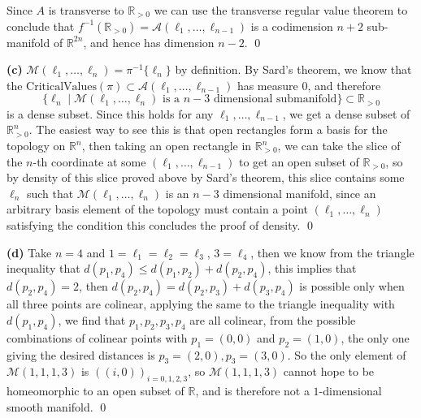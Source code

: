 \documentclass[10.5pt]{article}
\theoremstyle{definition}
\newcommand{\set}[1]{\{#1\}}
\begin{document}
    Since \(A\) is transverse to \(\mathbb{R}_{>0}\) we can use the transverse regular value theorem to conclude that \(f^{-1}(\mathbb{R}_{>0}) = \mathcal{A}(\ell_1,\hdots,\ell_{n-1})\) is a codimension \(n+2\) sub-manifold of \(\mathbb{R}^{2n}\), and hence has dimension \(n-2\). \qed

    \textbf{(c)} \(\mathcal{M}(\ell_1,\hdots,\ell_n) = \pi^{-1}\set{\ell_n}\) by definition. By Sard's theorem, we know that the \(\text{CriticalValues}(\pi) \subset \mathcal{A}(\ell_1,\hdots,\ell_{n-1})\) has measure \(0\), and therefore \[\set{\ell_n \mid \mathcal{M}(\ell_1,\hdots,\ell_n) \text{ is a }n-3\text{ dimensional submanifold}} \subset \mathbb{R}_{>0}\]
    is a dense subset. Since this holds for any \(\ell_1,\hdots,\ell_{n-1}\), we get a dense subset of \(\mathbb{R}_{>0}^{n}\). The easiest way to see this is that open rectangles form a basis for the topology on \(\mathbb{R}^n\), then taking an open rectangle in \(\mathbb{R}_{>0}^n\), we can take the slice of the \(n\)-th coordinate at some \((\ell_1,\hdots,\ell_{n-1})\) to get an open subset of \(\mathbb{R}_{>0}\), so by density of this slice proved above by Sard's theorem, this slice contains some \(\ell_n\) such that \(\mathcal{M}(\ell_1,\hdots,\ell_n)\) is an \(n-3\) dimensional manifold, since an arbitrary basis element of the topology must contain a point \((\ell_1,\hdots,\ell_n)\) satisfying the condition this concludes the proof of density. \qed

    \textbf{(d)} Take \(n = 4\) and \(1 = \ell_1 = \ell_2 = \ell_3\), \(3 = \ell_4\), then we know from the triangle inequality that \(d(p_1,p_4) \leq d(p_1,p_2) + d(p_2,p_4)\), this implies that \(d(p_2,p_4) = 2\), then \(d(p_2,p_4) = d(p_2,p_3) + d(p_3,p_4)\) is possible only when all three points are colinear, applying the same to the triangle inequality with \(d(p_1,p_4)\), we find that \(p_1,p_2,p_3,p_4\) are all colinear, from the possible combinations of colinear points with \(p_1 = (0,0)\) and \(p_2 = (1,0)\), the only one giving the desired distances is \(p_3 = (2,0), p_3 = (3,0)\). So the only element of \(\mathcal{M}(1,1,1,3)\) is \(((i,0))_{i=0,1,2,3}\), so \(\mathcal{M}(1,1,1,3)\) cannot hope to be homeomorphic to an open subset of \(\mathbb{R}\), and is therefore not a \(1\)-dimensional smooth manifold. \qed
\end{document}
